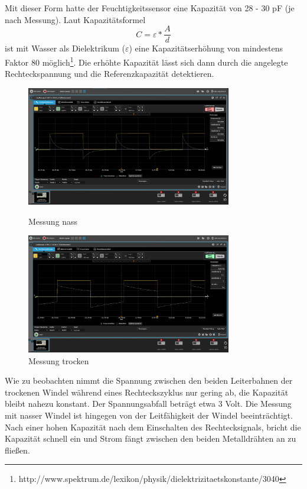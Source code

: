Mit dieser Form hatte der Feuchtigkeitssensor eine Kapazität von 28 - 30 pF (je nach Messung). Laut Kapazitätsformel 
\[C =  \varepsilon * \frac{A}{d}\]
ist mit Wasser als Dielektrikum ($\varepsilon$) eine Kapazitätserhöhung von mindestens Faktor 80 möglich\footnote{http://www.spektrum.de/lexikon/physik/dielektrizitaetskonstante/3040}. Die erhöhte Kapazität lässt sich dann durch die angelegte Rechteckspannung und die Referenzkapazität detektieren.

\begin{figure}[ht]
	\begin{minipage}[ht]{0.45\linewidth}
		\centering
		\includegraphics[width=0.8\textwidth]{includes/kom/graphics/MessungWindelnass_1Ohm_2_2u}
		\caption{Messung nass}
		\label{fig:cap_sensor_wet}
	\end{minipage}
	\begin{minipage}[ht]{0.45\linewidth}
		\centering
		\includegraphics[width=0.8\textwidth]{includes/kom/graphics/MessungWindel_1Ohm_2_2u}
		\caption{Messung trocken}
		\label{fig:cap_sensor_dry}
	\end{minipage}
\end{figure}

Wie zu beobachten nimmt die Spannung zwischen den beiden Leiterbahnen der trockenen Windel während eines Rechteckszyklus nur gering ab, die Kapazität bleibt nahezu konstant. Der Spannungsabfall beträgt etwa 3 Volt. Die Messung mit nasser Windel ist hingegen von der Leitfähigkeit der Windel beeinträchtigt. Nach einer hohen Kapazität nach dem Einschalten des Rechtecksignals, bricht die Kapazität schnell ein und Strom fängt zwischen den beiden Metalldrähten an zu fließen. 

